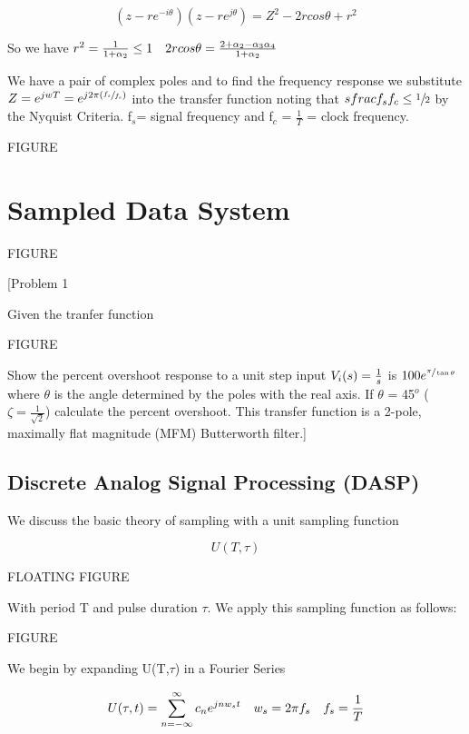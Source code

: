 \documentclass[11pt,fleqn]{book} %
\begin{document}
$$(z-re^{-i\theta})(z-re^{j\theta})=Z^2-2rcos\theta+r^2$$

So we have $r^2={1\over 1+\alpha_2}\leq1\quad 2rcos\theta={2+\alpha_2-\alpha_3\alpha_4\over 1+\alpha_2}$

We have a pair of complex poles and to find the frequency response we substitute $Z=e^{jwT}=e^{j2\pi(\sfrac{f_s}{f_c})}$ into the transfer function noting that $\\sfrac{f_s}{f_c}\leq\sfrac{1}{2}$ by the Nyquist Criteria. f$_s$= signal frequency and f$_c$ = $\frac{1}{T}$ = clock frequency.

FIGURE


\section{Sampled Data System}

FIGURE

[Problem 1

Given the tranfer function

FIGURE

Show the percent overshoot response to a unit step input $V_i(s)={1\over s}$ is $100 e^{\sfrac{\pi}{\tan\theta}}$ where $\theta$ is the angle determined by the poles with the real axis. If $\theta$ = 45$^o$ ($\zeta=\frac{1}{\sqrt{2}}$) calculate the percent overshoot. This transfer function is a 2-pole, maximally flat magnitude (MFM) Butterworth filter.]

\subsection{Discrete Analog Signal Processing (DASP)}

We discuss the basic theory of sampling with a unit sampling function

$$U(T,\tau)$$

FLOATING FIGURE

With period T and pulse duration $\tau$. We apply this sampling function as follows:

FIGURE

We begin by expanding U(T,$\tau$) in a Fourier Series

$$U(\tau,t)=\sum_{n=-\infty}^\infty c_ne^{jnw_st}\quad w_s=2\pi f_s \quad f_s={1\over T}$$
\end{document}
